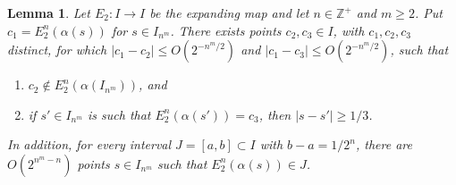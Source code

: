\documentclass{amsart}
\theoremstyle{theorem}
\newtheorem{lemma}[theorem]{Lemma}
\theoremstyle{remark}
\newcommand{\ZZ}{\mathbb{Z}}
\begin{document}
\begin{lemma}\label{lem:telicPerturb}
Let $E_2:I\rightarrow I$ be the expanding map and let $n\in \ZZ^+$ and $m \geq 2$.
Put $c_1 = E_2^n(\alpha(s))$ for $s \in I_{n^m}$. There exists points $c_2,c_3 \in I$, with $c_1,c_2,c_3$ distinct, for which $|c_1-c_2|\leq O(2^{-n^m/2})$ and $|c_1-c_3|\leq O(2^{-n^m/2})$, such that
\begin{enumerate}
\item $c_2 \not\in E_2^n(\alpha(I_{n^m}))$, and
\item if $s' \in I_{n^m}$ is such that $E_2^n(\alpha(s'))=c_3$, then $|s-s'| \geq 1/3$.
\end{enumerate}
In addition, for every interval $J = [a, b] \subset I$ with $b-a = 1/2^n$, there are $O(2^{n^m-n})$ points $s \in I_{n^m}$ such that $E_2^n(\alpha(s)) \in J$.
\end{lemma}
\end{document}
